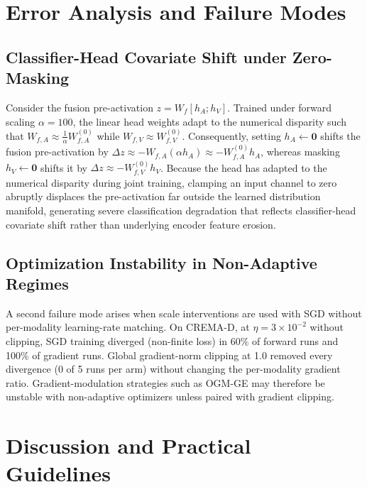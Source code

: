 \documentclass[conference]{IEEEtran}
\begin{document}
\section{Error Analysis and Failure Modes}

\subsection{Classifier-Head Covariate Shift under Zero-Masking}
Consider the fusion pre-activation $z = W_f [h_A; h_V]$. Trained under forward scaling $\alpha = 100$, the linear head weights adapt to the numerical disparity such that $W_{f, A} \approx \frac{1}{\alpha} W_{f, A}^{(0)}$ while $W_{f, V} \approx W_{f, V}^{(0)}$. Consequently, setting $h_A \leftarrow \mathbf{0}$ shifts the fusion pre-activation by $\Delta z \approx - W_{f, A} (\alpha h_A) \approx - W_{f, A}^{(0)} h_A$, whereas masking $h_V \leftarrow \mathbf{0}$ shifts it by $\Delta z \approx - W_{f, V}^{(0)} h_V$. Because the head has adapted to the numerical disparity during joint training, clamping an input channel to zero abruptly displaces the pre-activation far outside the learned distribution manifold, generating severe classification degradation that reflects classifier-head covariate shift rather than underlying encoder feature erosion.

\subsection{Optimization Instability in Non-Adaptive Regimes}
A second failure mode arises when scale interventions are used with SGD without per-modality learning-rate matching. %
On CREMA-D, at $\eta = 3\times10^{-2}$ without clipping, SGD training diverged (non-finite loss) in 60\% of forward runs and 100\% of gradient runs. Global gradient-norm clipping at 1.0 removed every divergence (0 of 5 runs per arm) without changing the per-modality gradient ratio. Gradient-modulation strategies such as OGM-GE may therefore be unstable with non-adaptive optimizers unless paired with gradient clipping.

\section{Discussion and Practical Guidelines}
\end{document}
